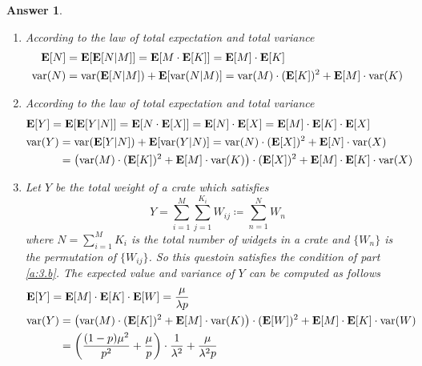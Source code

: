 \documentclass[utf8]{article}
\theoremstyle{definition}%
\theoremstyle{plain}%
\newtheorem{answer}{Answer} %
\begin{document}
\begin{answer} ~
    \begin{enumerate}[label=(\alph*)]
        \item According to the law of total expectation and total variance
        \begin{align}
            \mathbf{E}[N] &= \mathbf{E}[\mathbf{E}[N | M]] = \mathbf{E}[M \cdot \mathbf{E}[K]] = \mathbf{E}[M] \cdot \mathbf{E}[K] \\
            \mathrm{var}(N) &= \mathrm{var}(\mathbf{E}[N | M]) + \mathbf{E}[\mathrm{var}(N | M)] = \mathrm{var}(M) \cdot (\mathbf{E}[K])^2 + \mathbf{E}[M] \cdot \mathrm{var}(K)
        \end{align}
        \item \label{a:3.b} According to the law of total expectation and total variance
        \begin{align}
            &\mathbf{E}[Y] = \mathbf{E}[\mathbf{E}[Y | N]] = \mathbf{E}[N \cdot \mathbf{E}[X]] = \mathbf{E}[N] \cdot \mathbf{E}[X] = \mathbf{E}[M] \cdot \mathbf{E}[K] \cdot \mathbf{E}[X] \\
            &\begin{aligned}
                \mathrm{var}(Y) &= \mathrm{var}(\mathbf{E}[Y | N]) + \mathbf{E}[\mathrm{var}(Y | N)] = \mathrm{var}(N) \cdot (\mathbf{E}[X])^2 + \mathbf{E}[N] \cdot \mathrm{var}(X) \\ 
                &= \qty(\mathrm{var}(M) \cdot (\mathbf{E}[K])^2 + \mathbf{E}[M] \cdot \mathrm{var}(K)) \cdot (\mathbf{E}[X])^2 + \mathbf{E}[M] \cdot \mathbf{E}[K] \cdot \mathrm{var}(X) \\
            \end{aligned}
        \end{align}
        \item Let $Y$ be the total weight of a crate which satisfies
        \begin{equation}
            Y = \sum_{i=1}^M \sum_{j=1}^{K_i} W_{ij} \coloneqq \sum_{n=1}^N W_n
        \end{equation}
        where $N = \sum_{i=1}^M K_i$ is the total number of widgets in a crate and $\{W_n\}$ is the permutation of $\{W_{ij}\}$. So this questoin satisfies the condition of part \ref{a:3.b}. The expected value and variance of $Y$ can be computed as follows
        \begin{align}
            &\mathbf{E}[Y] = \mathbf{E}[M] \cdot \mathbf{E}[K] \cdot \mathbf{E}[W] = \frac{\mu}{\lambda p} \\
            &\begin{aligned}
                \mathrm{var}(Y) &= \qty(\mathrm{var}(M) \cdot (\mathbf{E}[K])^2 + \mathbf{E}[M] \cdot \mathrm{var}(K)) \cdot (\mathbf{E}[W])^2 + \mathbf{E}[M] \cdot \mathbf{E}[K] \cdot \mathrm{var}(W) \\ 
                &= \qty(\frac{(1 - p)\mu^2}{p^2} + \frac{\mu}{p}) \cdot \frac{1}{\lambda^2} + \frac{\mu}{\lambda^2 p}
            \end{aligned}
        \end{align}
    \end{enumerate}
    
\end{answer}
\end{document}
